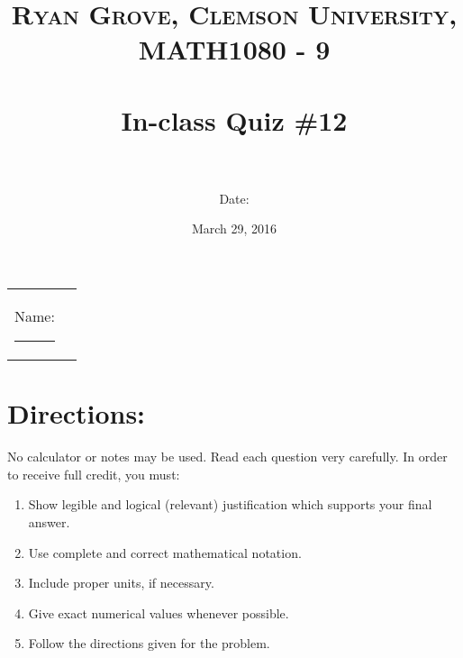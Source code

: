 \documentclass[paper=a4, fontsize=11pt]{scrartcl} %
\title{	
\normalfont \normalsize 
\textsc{Ryan Grove, Clemson University, MATH1080 - 9} \\ [25pt] %
\horrule{0.5pt} \\[0.4cm] %
\huge In-class Quiz \#12 \\ %
\horrule{2pt} \\[0.5cm] %
}
\author{Date:} %
\date{\normalsize March 29, 2016} %
\numberwithin{equation}{section} %
\numberwithin{figure}{section} %
\numberwithin{table}{section} %
\begin{document}
\maketitle %

\begin{flushleft}
\begin{tabular}{l l}
Name: \rule{3.2in}{.01cm}  & {}%
\end{tabular}
\end{flushleft}


\section*{\textbf{Directions:}}

No calculator or notes may be used.  Read each question very carefully.  In order to receive full credit, you must:
\begin{enumerate}
\item Show legible and logical (relevant) justification which supports your final answer.
\item Use complete and correct mathematical notation.
\item Include proper units, if necessary.
\item Give exact numerical values whenever possible.
\item Follow the directions given for the problem.
\end{enumerate}
\vspace{.1in}

\newpage
\end{document}
